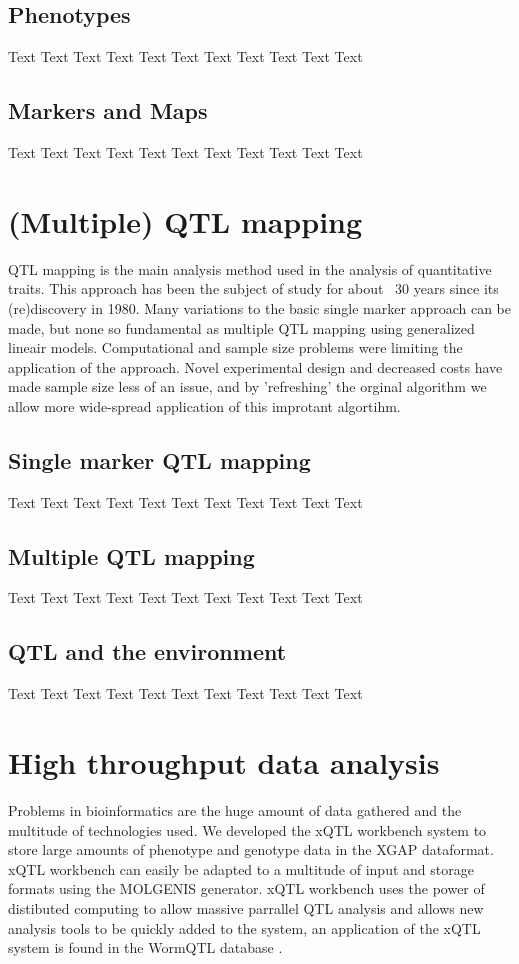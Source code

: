 \documentclass[10pt, oneside, a5paper]{report}
\begin{document}
\section{Phenotypes}
Text Text Text Text Text Text Text Text Text Text Text

\section{Markers and Maps}
Text Text Text Text Text Text Text Text Text Text Text

\chapter{(Multiple) QTL mapping}
QTL mapping is the main analysis method used in the analysis of quantitative traits. This approach has been the subject of study for about ~30 years since its (re)discovery in 1980. Many variations to the basic single marker approach can be made, but none so fundamental as multiple QTL mapping using generalized lineair models. Computational and sample size problems were limiting the application of the approach. Novel experimental design and decreased costs have made sample size less of an issue, and by 'refreshing' the orginal algorithm we allow more wide-spread application of this improtant algortihm.
\section{Single marker QTL mapping}
Text Text Text Text Text Text\cite{Broman:2003, Arends:2010} Text Text Text Text Text

\section{Multiple QTL mapping}
Text Text Text Text Text Text Text Text Text Text Text

\section{QTL and the environment}
Text Text Text Text Text Text Text Text Text Text Text

\chapter{High throughput data analysis}
Problems in bioinformatics are the huge amount of data gathered and the multitude of technologies used. We developed the xQTL workbench system\cite{Arends:2012} to store large amounts of phenotype and genotype data in the XGAP\cite{Swertz:2010} dataformat. xQTL workbench can easily be adapted to a multitude of input and storage formats using the MOLGENIS\cite{Swertz:2004} generator. xQTL workbench uses the power of distibuted computing to allow massive parrallel QTL analysis and allows new analysis tools to be quickly added to the system, an application of the xQTL system is found in the WormQTL database \cite{Snoek:2012}.
\end{document}
